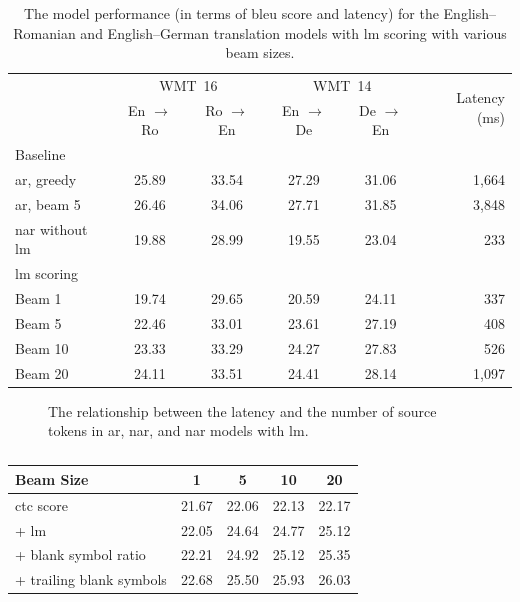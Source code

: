 \begin{table}
  \centering

  \begin{tabular}{lccccr}
    \toprule
    & \multicolumn{2}{c}{WMT~16}
    & \multicolumn{2}{c}{WMT~14}
    & \multirow{2}{*}{Latency (ms)} \\
    & En $\rightarrow$ Ro & Ro $\rightarrow$ En
    & En $\rightarrow$ De & De $\rightarrow$ En  & \\
    \midrule
    Baseline & & & & & \\
    \acs{ar}, greedy & 25.89 & 33.54 & 27.29 &  31.06 & 1,664 \\
    \acs{ar}, beam 5 & 26.46 & 34.06 & 27.71 & 31.85 & 3,848 \\
    \acs{nar} without \acs{lm} & 19.88 & 28.99 & 19.55 & 23.04 & 233 \\
    \addlinespace
    \acs{lm} scoring & & & & & \\
    Beam 1 & 19.74 & 29.65 & 20.59 & 24.11 &  337 \\
    Beam 5 & 22.46 & 33.01 & 23.61 & 27.19 & 408  \\
    Beam 10 & 23.33 & 33.29 & 24.27 & 27.83 & 526 \\
    Beam 20 & 24.11 & 33.51 & 24.41 & 28.14 & 1,097 \\
    \bottomrule
  \end{tabular}

  \caption{The model performance (in terms of \acs{bleu} score and latency) for
    the English--Romanian and English--German translation models with \acs{lm}
    scoring with various beam sizes.}%
  \label{tab:ngrams:bleu}
\end{table}


\begin{figure}
  \centering
  

  \caption{The relationship between the latency and the number of source tokens
    in \acs{ar}, \acs{nar}, and \acs{nar} models with \acs{lm}.}%
  \label{fig:ngrams:speed}
\end{figure}


\begin{table}
  \centering

  \begin{tabular}{lcccc}
    \toprule
    Beam Size &  1 &  5 &  10 &  20 \\
    \midrule
    \acs{ctc} score & 21.67 & 22.06 & 22.13 & 22.17 \\
    \quad + \acs{lm} & 22.05 & 24.64 & 24.77 & 25.12 \\
    \quad + blank symbol ratio & 22.21 & 24.92 & 25.12 & 25.35 \\
    \quad + trailing blank symbols  & 22.68 & 25.50 & 25.93 & 26.03 \\
    \bottomrule
  \end{tabular}

  \caption{}%
  \label{tab:}
\end{table}






